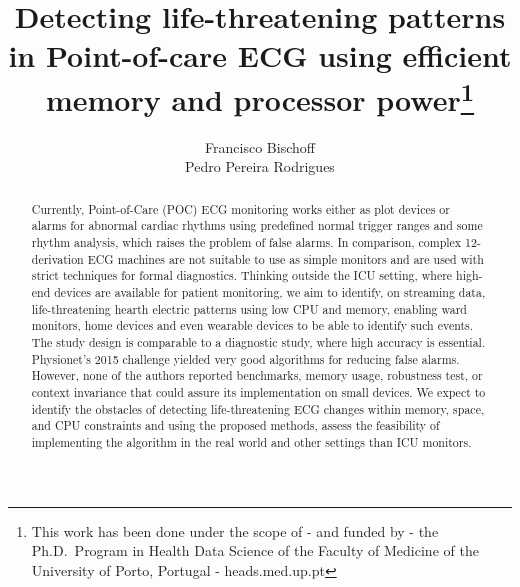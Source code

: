 \documentclass[runningheads]{llncs}
\begin{document}
%
\title{Detecting life-threatening patterns in Point-of-care ECG using efficient memory and processor power\thanks{This work has been done under the scope of - and funded by - the Ph.D.~Program in Health Data
Science of the Faculty of Medicine of the University of Porto, Portugal - heads.med.up.pt}}
%
%
%
\author{  Francisco Bischoff\\  Pedro Pereira Rodrigues }

%


\maketitle              %
%

\begin{abstract}
  Currently, Point-of-Care (POC) ECG monitoring works either as plot devices or alarms for abnormal
  cardiac rhythms using predefined normal trigger ranges and some rhythm analysis, which raises the
  problem of false alarms. In comparison, complex 12-derivation ECG machines are not suitable to use
  as simple monitors and are used with strict techniques for formal diagnostics. Thinking outside the
  ICU setting, where high-end devices are available for patient monitoring, we aim to identify, on
  streaming data, life-threatening hearth electric patterns using low CPU and memory, enabling ward
  monitors, home devices and even wearable devices to be able to identify such events. The study
  design is comparable to a diagnostic study, where high accuracy is essential. Physionet's 2015
  challenge yielded very good algorithms for reducing false alarms. However, none of the authors
  reported benchmarks, memory usage, robustness test, or context invariance that could assure its
  implementation on small devices. We expect to identify the obstacles of detecting life-threatening
  ECG changes within memory, space, and CPU constraints and using the proposed methods, assess the
  feasibility of implementing the algorithm in the real world and other settings than ICU monitors.


\end{abstract}
%
%
\end{document}
